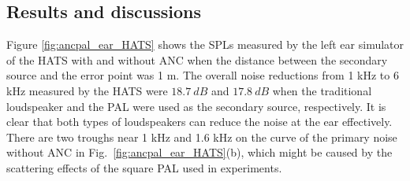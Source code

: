 \subsection{Results and discussions}
Figure \ref{fig:ancpal_ear_HATS} shows the SPLs measured by the left ear simulator of the HATS with and without ANC when the distance between the secondary source and the error point was 1 m. 
The overall noise reductions from 1 kHz to 6 kHz measured by the HATS were $\SI{18.7}{dB}$ and $\SI{17.8}{dB}$ when the traditional loudspeaker and the PAL were used as the secondary source, respectively. 
It is clear that both types of loudspeakers can reduce the noise at the ear effectively. 
There are two troughs near 1 kHz and 1.6 kHz on the curve of the primary noise without ANC in Fig.~\ref{fig:ancpal_ear_HATS}(b), which might be caused by the scattering effects of the square PAL used in experiments. 

